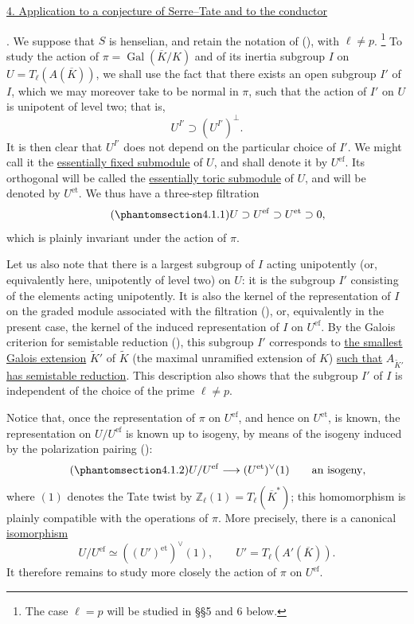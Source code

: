 
\medskip
\noindent
\underline{4. Application to a conjecture of Serre--Tate and to the
conductor}

\medskip
\noindent
{}. We suppose that $S$ is henselian, and retain the notation of (),
with $\ell\ne p$.
\footnote{The case $\ell=p$ will be studied in \S\S5 and 6 below.}
To study the action of $\pi=\operatorname{Gal}(\overline K/K)$ and of its
inertia subgroup $I$ on $U=T_\ell(A(\overline K))$, we shall use the fact
that there exists an open subgroup $I'$ of $I$, which we may moreover take
to be normal in $\pi$, such that the action of $I'$ on $U$ is unipotent of
level two; that is,
\[
 U^{I'}\supset (U^{I'})^\perp.
\]
It is then clear that $U^{I'}$ does not depend on the particular choice of
$I'$.  We might call it the \underline{essentially fixed submodule} of
$U$, and shall denote it by $U^{\mathrm{ef}}$.  Its orthogonal will be
called the \underline{essentially toric submodule} of $U$, and will be
denoted by $U^{\mathrm{et}}$.  We thus have a three-step filtration
\begin{equation}\tag{\SGARefTarget{sga7.sga7i.eix.n4-1-1}{4.1.1}}
 U\supset U^{\mathrm{ef}}\supset U^{\mathrm{et}}\supset0,
\end{equation}
which is plainly invariant under the action of $\pi$.

Let us also note that there is a largest subgroup of $I$ acting
unipotently (or, equivalently here, unipotently of level two) on $U$: it
is the subgroup $I'$ consisting of the elements acting unipotently.  It is
also the kernel of the representation of $I$ on the graded module
associated with the filtration (), or, equivalently in the present
case, the kernel of the induced representation of $I$ on
$U^{\mathrm{ef}}$.  By the Galois criterion for semistable reduction
(), this subgroup $I'$ corresponds to \underline{the smallest Galois
extension} $\widetilde K'$ of $\widetilde K$ (the maximal unramified
extension of $K$) \underline{such that} $A_{\widetilde K'}$ \underline{has
semistable reduction}.  This description also shows that the subgroup
$I'$ of $I$ is independent of the choice of the prime $\ell\ne p$.

Notice that, once the representation of $\pi$ on $U^{\mathrm{ef}}$, and
hence on $U^{\mathrm{et}}$, is known, the representation on
$U/U^{\mathrm{ef}}$ is known up to isogeny, by means of the isogeny
induced by the polarization pairing ():
\begin{equation}\tag{\SGARefTarget{sga7.sga7i.eix.n4-1-2}{4.1.2}}
 U/U^{\mathrm{ef}}\longrightarrow (U^{\mathrm{et}})^\vee(1)
 \qquad\text{an isogeny},
\end{equation}
where $(1)$ denotes the Tate twist by
$\mathbb Z_\ell(1)=T_\ell(\overline K^*)$; this homomorphism is plainly
compatible with the operations of $\pi$.  More precisely, there is a
canonical \underline{isomorphism}
\[
 U/U^{\mathrm{ef}}\simeq ((U')^{\mathrm{et}})^\vee(1),
 \qquad U'=T_\ell(A'(\overline K)).
\]
It therefore remains to study more closely the action of $\pi$ on
$U^{\mathrm{ef}}$.

